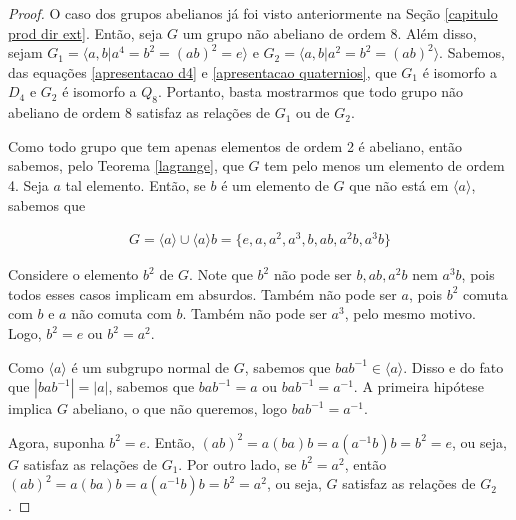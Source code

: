 \documentclass[a4paper,portuguese,11pt,twoside, leqno]{book}
\theoremstyle{definition}
\begin{document}
	\begin{proof}
		O caso dos grupos abelianos já foi visto anteriormente na Seção \ref{capitulo prod dir ext}. Então, seja $G$ um grupo não abeliano de ordem 8. Além disso, sejam $G_1 = \langle a,b | a^4 = b^2 =(ab)^2 = e \rangle$ e $G_2 = \langle a,b | a^2 = b^2 = (ab)^2 \rangle$. Sabemos, das equações \eqref{apresentacao d4} e \eqref{apresentacao quaternios}, que $G_1$ é isomorfo a $D_4$ e $G_2$ é isomorfo a $Q_8$. Portanto, basta mostrarmos que todo grupo não abeliano de ordem 8 satisfaz as relações de $G_1$ ou de $G_2$. 
		
		\par\vspace{0.3cm} Como todo grupo que tem apenas elementos de ordem 2 é abeliano, %
		então sabemos, pelo Teorema \eqref{lagrange}, que $G$ tem pelo menos um elemento de ordem 4. Seja $a$ tal elemento. Então, se $b$ é um elemento de $G$ que não está em $\langle a \rangle$, sabemos que 
		
		\begin{align*}
		G = \langle a \rangle\cup\langle a \rangle b = \{e, a, a^2, a^3, b, ab, a^2b, a^3b\}
		\end{align*}
		
		\par\vspace{0.3cm} Considere o elemento $b^2$ de $G$. Note que $b^2$ não pode ser $b, ab, a^2b$ nem $a^3b$, pois todos esses casos implicam em absurdos. Também não pode ser $a$, pois $b^2$ comuta com $b$ e $a$ não comuta com $b$. Também não pode ser $a^3$, pelo mesmo motivo. Logo, $b^2 = e$ ou $b^2 = a^2$. 
		
		\par\vspace{0.3cm} Como $\langle a \rangle$ é um subgrupo normal de $G$, sabemos que $bab^{-1}\in\langle a \rangle$. Disso e do fato que $|bab^{-1}| = |a|$, sabemos que $bab^{-1} = a$ ou $bab^{-1} = a^{-1}$. A primeira hipótese implica $G$ abeliano, o que não queremos, logo $bab^{-1} = a^{-1}$.
		
		\par\vspace{0.3cm} Agora, suponha $b^2 = e$. Então, $(ab)^2 = a(ba)b = a(a^{-1}b)b = b^2 = e$, ou seja, $G$ satisfaz as relações de $G_1$. Por outro lado, se $b^2 = a^2$, então $(ab)^2 = a(ba)b = a(a^{-1}b)b = b^2 = a^2$, ou seja, $G$ satisfaz as relações de $G_2$. 
		
	\end{proof}
	
\end{document}

